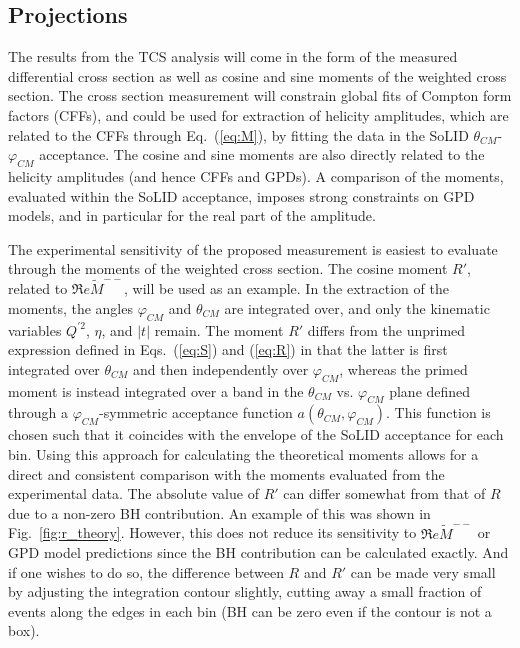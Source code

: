 \subsection{Projections}
\label{sec:tcsrate}

The results from the TCS analysis will come in the form of the measured
differential cross section as well as cosine and sine moments of the weighted
cross section. The cross section measurement will constrain global fits of
Compton form factors (CFFs), and could be used for extraction of helicity
amplitudes, which are related to the CFFs through Eq.~(\ref{eq:M}), by fitting
the data in the SoLID $\theta_{CM}$-$\varphi_{CM}$ acceptance.
The cosine and sine moments are also directly related to the helicity
amplitudes (and hence CFFs and GPDs). A comparison of the moments, evaluated
within the SoLID acceptance, imposes strong constraints on GPD models, and in
particular for the real part of the amplitude. 

The experimental sensitivity of the proposed measurement is easiest to
evaluate through the moments of the weighted cross section. The cosine moment
$R'$, related to $\Re e\tilde{M}^{--}$, will be used as an example. In the
extraction of the moments, the angles $\varphi_{CM}$ and $\theta_{CM}$ are
integrated over, and only the kinematic variables $Q^{\prime 2}$, $\eta$, and
$|t|$ remain.
The moment $R'$ differs from the unprimed expression defined in
Eqs.~(\ref{eq:S}) and (\ref{eq:R}) in that the latter is first integrated
over $\theta_{CM}$ and then independently over $\varphi_{CM}$, whereas the
primed moment is instead integrated over a band in the $\theta_{CM}$ vs.
$\varphi_{CM}$ plane defined through a $\varphi_{CM}$-symmetric acceptance
function $a(\theta_{CM},\varphi_{CM})$. This function is chosen such that it
coincides with the envelope of the SoLID acceptance for each bin. Using this
approach for calculating the theoretical moments allows for a direct and 
consistent comparison with the moments evaluated from the experimental data.
The absolute value of $R'$ can differ somewhat from that of $R$ due to a
non-zero BH contribution. An example of this was shown in
Fig.~\ref{fig:r_theory}. However, this does not reduce its sensitivity to
$\Re e\tilde{M}^{--}$ or GPD model predictions since the BH contribution
can be calculated exactly.
And if one wishes to do so, the difference between $R$ and $R'$ can be made
very small by adjusting the integration contour slightly, cutting away a small
fraction of events along the edges in each bin (BH can be zero even if the
contour is not a box).

